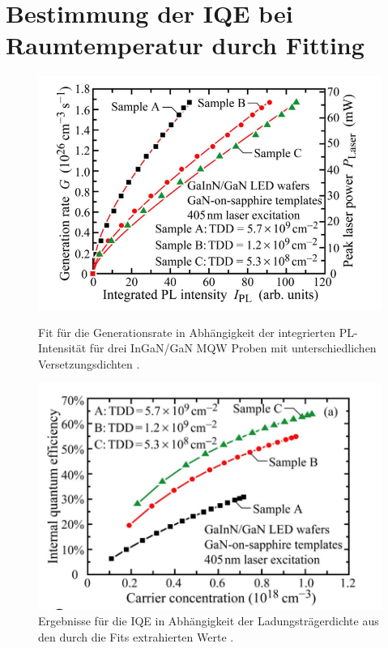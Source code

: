
\section{Bestimmung der IQE bei Raumtemperatur durch Fitting}
\label{chap:grundfitting}
\thispagestyle{fancy}

\begin{figure}[htb]
    \centering
    \begin{minipage}[t]{0.49\linewidth}
        \centering
        \includegraphics[width=\linewidth]{Bilder/raumtempMethodeBeispielFit.PNG}
        \caption{Fit für die Generationsrate in Abhängigkeit der integrierten PL-Intensität für drei InGaN/GaN MQW Proben mit unterschiedlichen Versetzungsdichten \cite{doi:10.1063/1.3100773}.}
    \end{minipage}%
    \hfill
    \begin{minipage}[t]{0.49\linewidth}
        \centering
        \includegraphics[width=\linewidth]{Bilder/raumtempMethodeIQE.PNG}
        \caption{Ergebnisse für die IQE in Abhängigkeit der Ladungsträgerdichte aus den durch die Fits extrahierten Werte \cite{doi:10.1063/1.3100773}. }
        \label{fig:iqert}
    \end{minipage}
\end{figure}
